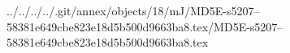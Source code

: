 ../../../../.git/annex/objects/18/mJ/MD5E-s5207--58381e649cbe823e18d5b500d9663ba8.tex/MD5E-s5207--58381e649cbe823e18d5b500d9663ba8.tex